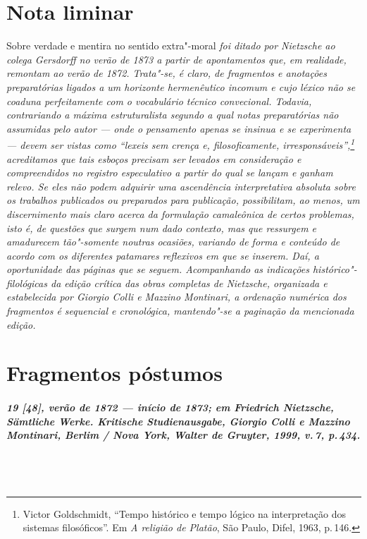 \chapter*{Nota liminar}

Sobre verdade e mentira no sentido extra"-moral {\itshape foi ditado por
Nietzsche ao colega Gersdorff no verão de 1873 a partir de apontamentos
que, em realidade, remontam ao verão de 1872. Trata"-se, é claro, de
fragmentos e anotações preparatórias ligados a um horizonte
hermenêutico incomum e cujo léxico não se coaduna perfeitamente 
com o vocabulário técnico convecional. Todavia, contrariando a máxima
estruturalista segundo a qual notas preparatórias não assumidas pelo
autor --- onde o pensamento apenas se insinua e se experimenta ---
devem ser vistas como “\emph{lexeis} sem
crença e, \emph{filosoficamente}, irresponsáveis”,\footnote{
Victor Goldschmidt, “Tempo histórico e tempo lógico na interpretação
dos sistemas filosóficos”. Em \textit{A religião de Platão}, São
Paulo, Difel, 1963, p.\,146.} acreditamos que tais esboços precisam ser
levados em consideração e compreendidos no registro especulativo a
partir do qual se lançam e ganham relevo. Se eles não podem adquirir
uma ascendência interpretativa absoluta sobre os trabalhos publicados
ou preparados para publicação, possibilitam, ao menos, um
discernimento mais claro acerca da formulação camaleônica de certos
problemas, isto é, de questões que surgem num dado contexto, mas que
ressurgem e amadurecem tão"-somente noutras ocasiões, variando de
forma e conteúdo de acordo com os diferentes patamares reflexivos em
que se inserem. Daí, a oportunidade das páginas que se seguem.
Acompanhando as indicações histórico"-filológicas da edição crítica
das obras completas de Nietzsche, organizada e estabelecida por Giorgio
Colli e Mazzino Montinari, a ordenação numérica dos fragmentos é
sequencial e cronológica, mantendo"-se a paginação da mencionada
edição.}
\pagebreak

\chapter*{Fragmentos póstumos}

\paragraph*{19 [48], verão de 1872 --- início de 1873; em Friedrich Nietzsche, 
\textit{Sämtliche Werke. Kritische Studienausgabe}, Giorgio Colli e
Mazzino Montinari, Berlim / Nova York, Walter de Gruyter, 1999, v.\,7, p.\,434.}
\ \\
\ \\

